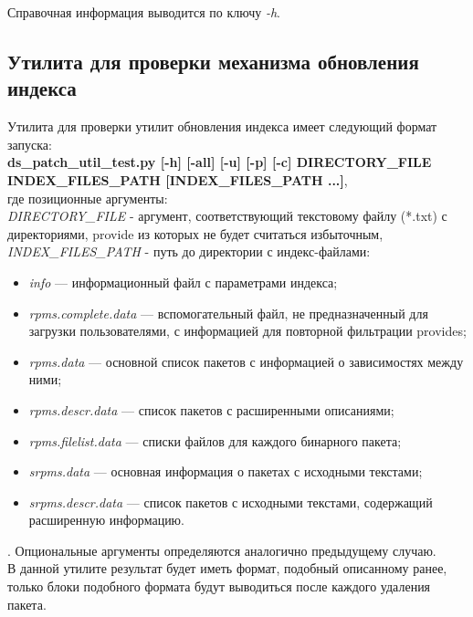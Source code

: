 Справочная информация выводится по ключу \emph{-h}.\\

\subsection{Утилита для проверки механизма обновления индекса}
Утилита для проверки утилит обновления индекса имеет следующий формат запуска:\\
\textbf{ds\_patch\_util\_test.py [-h] [-all] [-u] [-p] [-c] DIRECTORY\_FILE INDEX\_FILES\_PATH [INDEX\_FILES\_PATH ...]},\\
 где
позиционные аргументы:\\
\emph{DIRECTORY\_FILE} - аргумент, соответствующий текстовому файлу (*.txt) с 
директориями, provide из которых не будет считаться избыточным,\\
\emph{INDEX\_FILES\_PATH} - путь до директории с индекс-файлами: \\
\begin{itemize}
\item{\textit{info} --- информационный файл с параметрами индекса;} 
\item{\textit{rpms.complete.data} --- вспомогательный файл, не предназначенный
для загрузки пользователями, с информацией для повторной фильтрации
provides;}
\item{\textit{rpms.data} --- основной список пакетов с информацией о зависимостях между ними;}
\item{\textit{rpms.descr.data} --- список пакетов с расширенными описаниями;}
\item{\textit{rpms.filelist.data} --- списки файлов для каждого бинарного пакета;}
\item{\textit{srpms.data} --- основная информация о пакетах с исходными текстами;}
\item{\textit{srpms.descr.data} --- список пакетов с исходными текстами, содержащий
расширенную информацию.}
\end{itemize}.
Опциональные аргументы определяются аналогично предыдущему случаю. \\
В данной утилите результат будет иметь  формат, подобный описанному ранее, 
только блоки подобного формата будут выводиться после каждого удаления пакета.


